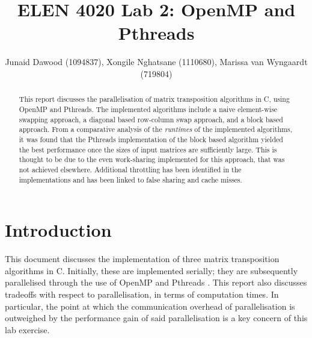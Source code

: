 \documentclass[journal,10pt]{IEEEtran}
\begin{document}
%
\title{ELEN 4020 Lab 2: OpenMP and Pthreads}
%
%
%
\author{Junaid Dawood (1094837), Xongile Nghatsane (1110680), Marissa van Wyngaardt (719804)}%



\maketitle


\begin{abstract}
This report discusses the parallelisation of matrix transposition algorithms in C, using OpenMP and Pthreads. The implemented algorithms include a naive element-wise swapping approach, a diagonal based row-column swap approach, and a block based approach. From a comparative analysis of the \textit{runtimes} of the implemented algorithms, it was found that the Pthreads implementation of the block based algorithm yielded the best performance once the sizes of input matrices are sufficiently large. This is thought to be due to the even work-sharing implemented for this approach, that was not achieved elsewhere. Additional throttling has been identified in the implementations and has been linked to false sharing and cache misses.
\end{abstract}

\IEEEpeerreviewmaketitle

\section{Introduction}

This document discusses the implementation of three matrix transposition algorithms in C. Initially, these are implemented serially; they are subsequently parallelised through the use of OpenMP and Pthreads \cite{omp,pthreads}. This report also discusses tradeoffs with respect to parallelisation, in terms of computation times. In particular, the point at which the communication overhead of parallelisation is outweighed by the performance gain of said parallelisation is a key concern of this lab exercise.
\end{document}
